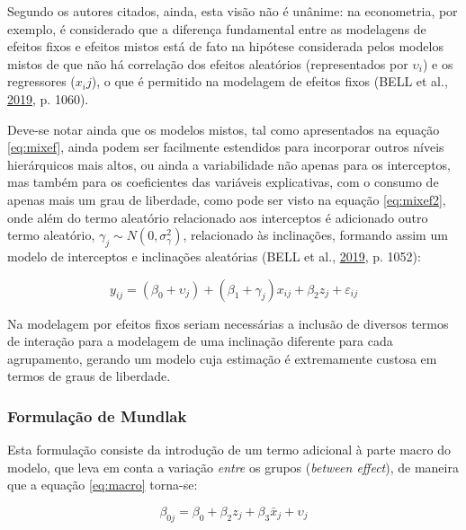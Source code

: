 \documentclass[
  a4paper, 11pt]{article}
\begin{document}
Segundo os autores citados, ainda, esta visão não é unânime: na
econometria, por exemplo, é considerado que a diferença fundamental
entre as modelagens de efeitos fixos e efeitos mistos está de fato na
hipótese considerada pelos modelos mistos de que não há correlação dos
efeitos aleatórios (representados por \(\upsilon_i\)) e os regressores
(\(x_ij\)), o que é permitido na modelagem de efeitos fixos (BELL et
al., \protect\hyperlink{ref-bell2019}{2019}, p. 1060).

Deve-se notar ainda que os modelos mistos, tal como apresentados na
equação \ref{eq:mixef}, ainda podem ser facilmente estendidos para
incorporar outros níveis hierárquicos mais altos, ou ainda a
variabilidade não apenas para os interceptos, mas também para os
coeficientes das variáveis explicativas, com o consumo de apenas mais um
grau de liberdade, como pode ser visto na equação \ref{eq:mixef2}, onde
além do termo aleatório relacionado aos interceptos é adicionado outro
termo aleatório, \(\gamma_j \sim N(0, \sigma^2_\gamma)\), relacionado às
inclinações, formando assim um modelo de interceptos e inclinações
aleatórias (BELL et al., \protect\hyperlink{ref-bell2019}{2019}, p.
1052):

\begin{equation} \label{eq:mixef2}
y_{ij} = (\beta_0 + \upsilon_j) + (\beta_1 + \gamma_j) x_{ij} + \beta_2 z_j + \varepsilon_{ij}
\end{equation}

Na modelagem por efeitos fixos seriam necessárias a inclusão de diversos
termos de interação para a modelagem de uma inclinação diferente para
cada agrupamento, gerando um modelo cuja estimação é extremamente
custosa em termos de graus de liberdade.

\hypertarget{formulauxe7uxe3o-de-mundlak}{%
\subsubsection{Formulação de
Mundlak}\label{formulauxe7uxe3o-de-mundlak}}

Esta formulação consiste da introdução de um termo adicional à parte
macro do modelo, que leva em conta a variação \emph{entre} os grupos
(\emph{between effect}), de maneira que a equação \ref{eq:macro}
torna-se:

\begin{equation} \label{eq:macro2}
\beta_{0j} = \beta_0 + \beta_2 z_{j} + \beta_3 \bar{x}_j + \upsilon_{j} 
\end{equation}
\end{document}
